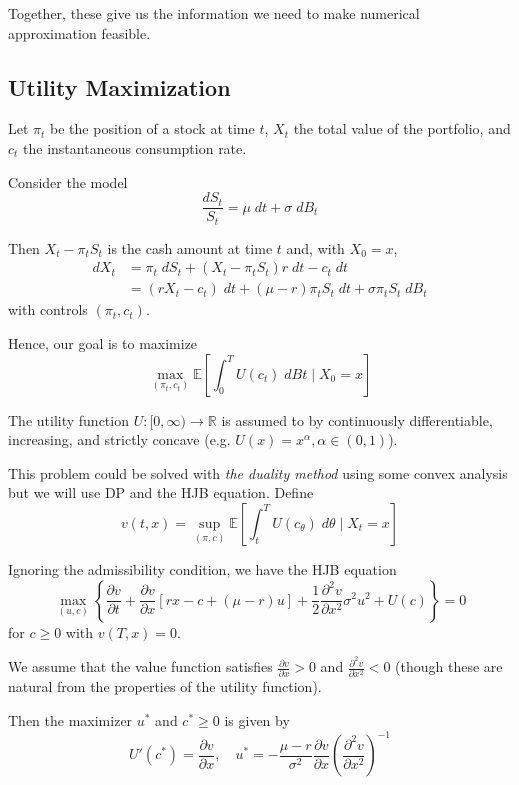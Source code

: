 \documentclass[12pt]{report}
\newcommand{\R}{\mathbb{R}}
\newcommand{\E}{\mathbb{E}}
\begin{document}
        Together, these give us the information we need to make numerical approximation feasible. 

    \subsection{Utility Maximization} 
        Let $\pi_t$ be the position of a stock at time $t$, $X_t$ the total value of the portfolio, and $c_t$ the instantaneous consumption rate.  

        Consider the model 
        \[\frac{dS_t}{S_t} = \mu \; dt + \sigma \;dB_t\]

        Then $X_t - \pi_t S_t$ is the cash amount at time $t$ and, with $X_0 = x$, 
        \begin{align*}
            dX_t &= \pi_t \; dS_t + (X_t - \pi_t S_t) r\; dt - c_t\; dt\\ 
                &= (rX_t - c_t)\; dt + (\mu - r)\pi_t S_t\; dt + \sigma \pi_t S_t\; dB_t 
        \end{align*}
        with controls $(\pi_t, c_t)$. 

        Hence, our goal is to maximize
        \[\max_{(\pi_t, c_t)} \E\left[\int_0^T U(c_t)\; dBt \; \bigg\vert \; X_0 = x\right]\]

        The utility function $U: [0, \infty) \to \R$ is assumed to by continuously differentiable, increasing, and strictly concave (e.g. $U(x) = x^{\alpha}, \alpha \in (0, 1)$).

        This problem could be solved with \emph{the duality method} using some convex analysis but we will use DP and the HJB equation. Define 
        \[v(t, x) = \sup_{(\pi, c)} \E\left[\int_t^T U(c_{\theta})\; d\theta \; \bigg\vert \; X_t = x\right]\]

        Ignoring the admissibility condition, we have the HJB equation 
        \[\max_{(u, c)} \left\{\frac{\partial v}{\partial t} + \frac{\partial v}{\partial x} [rx - c + (\mu - r)u] + \frac{1}{2}\frac{\partial^2 v}{\partial x^2} \sigma^2 u^2 + U(c)\right\} = 0\]
        for $c \geq 0$ with $v(T, x) = 0$. 

        We assume that the value function satisfies $\frac{\partial v}{\partial x} > 0$ and $\frac{\partial^2 v}{\partial x^2} < 0$ (though these are natural from the properties of the utility function).

        Then the maximizer $u^*$ and $c^* \geq 0$ is given by 
        \[U'(c^*) = \frac{\partial v}{\partial x}, \quad u^* = -\frac{\mu - r}{\sigma^2} \frac{\partial v}{\partial x} \left(\frac{\partial^2 v}{\partial x^2}\right)^{-1} \]
\end{document}
